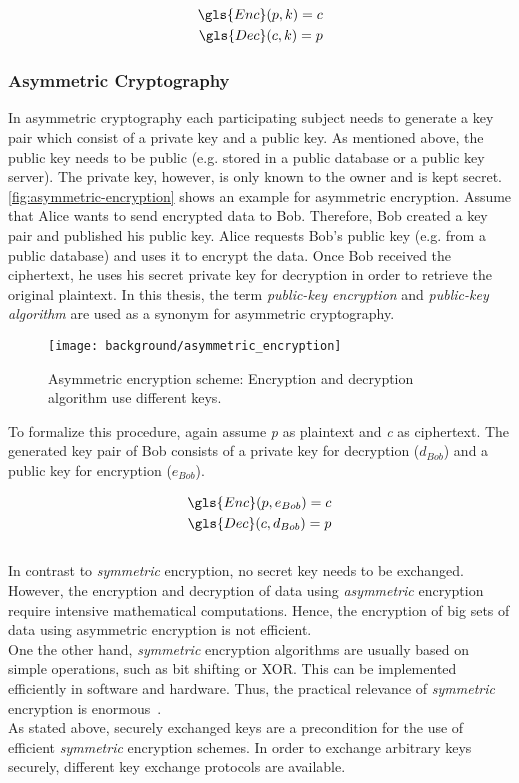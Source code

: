 \begin{align*}
\gls{Enc}(p, k) = c\\
\gls{Dec}(c, k) = p
\end{align*}

\subsubsection{Asymmetric Cryptography}

In asymmetric cryptography each participating subject needs to generate a key pair which consist of a private key and a public key. As mentioned above, the public key needs to be public (e.g. stored in a public database or a public key server). The private key, however, is only known to the owner and is kept secret.
\autoref{fig:asymmetric-encryption} shows an example for asymmetric encryption. Assume that Alice wants to send encrypted data to Bob. Therefore, Bob created a key pair and published his public key. Alice requests Bob's public key (e.g. from a public database) and uses it to encrypt the data. Once Bob received the ciphertext, he uses his secret private key for decryption in order to retrieve the original  plaintext. In this thesis, the term \textit{public-key encryption} and \textit{public-key algorithm} are used as a synonym for asymmetric cryptography.

\begin{figure}[htpb]
  \centering
  \texttt{[image: background/asymmetric\_encryption]}
  \caption[Asymmetric encryption scheme]{Asymmetric encryption scheme: Encryption and decryption algorithm use different keys.} \label{fig:asymmetric-encryption}
\end{figure}
To formalize this procedure, again assume \textit{p} as plaintext and \textit{c} as ciphertext. The generated key pair of Bob consists of a private key for decryption ($d_{Bob}$) and a public key for encryption ($e_{Bob}$).

\begin{align*}
\gls{Enc}(p, e_{Bob}) = c\\
\gls{Dec}(c, d_{Bob}) = p
\end{align*}
\\
In contrast to \textit{symmetric} encryption, no secret key needs to be exchanged. However, the encryption and decryption of data using \textit{asymmetric} encryption require intensive mathematical computations. Hence, the encryption of big sets of data using asymmetric encryption is not efficient.\\
One the other hand, \textit{symmetric} encryption algorithms are usually based on simple operations, such as bit shifting or XOR. This can be implemented efficiently in software and hardware. Thus, the practical relevance of \textit{symmetric} encryption is enormous~\parencite{ITSicherheit}.
\\
As stated above, securely exchanged keys are a precondition for the use of efficient \textit{symmetric} encryption schemes. In order to exchange arbitrary keys securely, different key exchange protocols are available.

